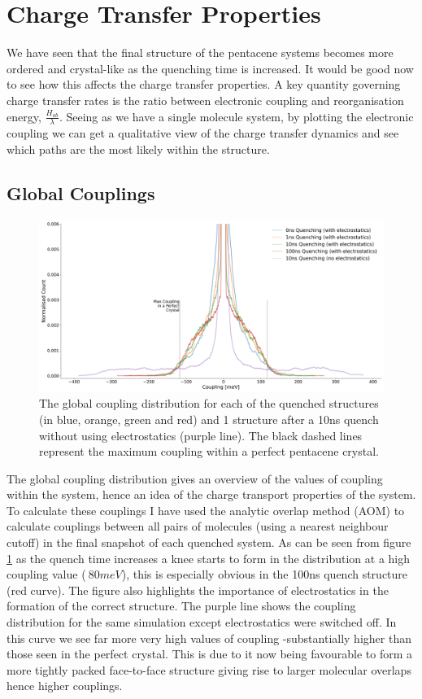 \section{Charge Transfer Properties}
We have seen that the final structure of the pentacene systems becomes more ordered and crystal-like as the quenching time is increased. It would be good now to see how this affects the charge transfer properties. A key quantity governing charge transfer rates is the ratio between electronic coupling and reorganisation energy, $\frac{H_{ab}}{\lambda}$. Seeing as we have a single molecule system, by plotting the electronic coupling we can get a qualitative view of the charge transfer dynamics and see which paths are the most likely within the structure.
\subsection{Global Couplings}
\begin{figure}[ht]
	\includegraphics[width=\textwidth]{./img/DifferentQuenchTimes/GlobalCouplings.png}
	\caption{\label{fig:glob_coup}The global coupling distribution for each of the quenched structures (in blue, orange, green and red) and 1 structure after a 10ns quench without using electrostatics (purple line). The black dashed lines represent the maximum coupling within a perfect pentacene crystal.}
\end{figure}
\noindent The global coupling distribution gives an overview of the values of coupling within the system, hence an idea of the charge transport properties of the system. To calculate these couplings I have used the analytic overlap method (AOM)\cite{gajdos_ultrafast_2014} to calculate couplings between all pairs of molecules (using a nearest neighbour cutoff) in the final snapshot of each quenched system. As can be seen from figure \ref{fig:glob_coup} as the quench time increases a knee starts to form in the distribution at a high coupling value ($~80 meV$), this is especially obvious in the 100ns quench structure (red curve). The figure also highlights the importance of electrostatics in the formation of the correct structure. The purple line shows the coupling distribution for the same simulation except electrostatics were switched off. In this curve we see far more very high values of coupling -substantially higher than those seen in the perfect crystal. This is due to it now being favourable to form a more tightly packed face-to-face structure giving rise to larger molecular overlaps hence higher couplings.
